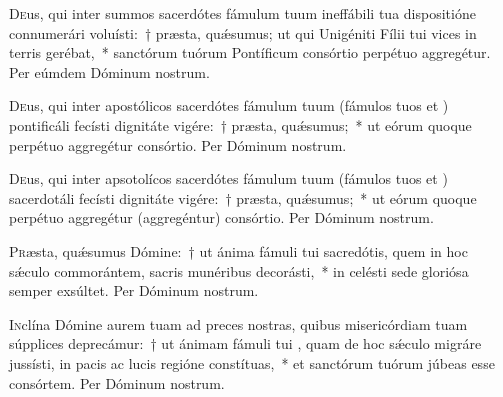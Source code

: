 \documentclass[vesperale_romanum]{subfiles}
\begin{document}

\lettrine{D}{e}us, qui inter summos sacerdótes fámulum tuum \nomen{} ineffábili tua dispositióne connumerári voluísti:~†
 præsta, quǽsumus; ut qui Unigéniti Fílii tui vices in terris gerébat,~*
  sanctórum tuórum Pontíficum consórtio perpétuo aggregétur. Per eúmdem Dóminum nostrum.


\lettrine{D}{e}us,  qui inter apostólicos sacerdótes fámulum tuum \nomen{} (fámulos tuos \nomen{} et  \nomen{}) 
pontificáli fecísti dignitáte vigére:~† præsta, quǽsumus;~* ut eórum quoque perpétuo aggregétur consórtio. Per Dóminum nostrum.






\lettrine{D}{e}us, qui inter apsotolícos sacerdótes fámulum tuum \nomen{} (fámulos tuos \nomen{} et \nomen{})
 sacerdotáli fecísti dignitáte vigére:~† præsta, quǽsumus;~*
  ut eórum quoque perpétuo aggregétur (aggregéntur) consórtio. Per Dóminum nostrum.


\lettrine{P}{r}æsta, quǽsumus Dómine:~† ut ánima fámuli tui \nomen{} sacredótis, quem in hoc sǽculo commorántem,
 sacris munéribus decorásti,~* in celésti sede gloriósa semper exsúltet. 
Per Dóminum nostrum.


\lettrine{I}{n}clína Dómine aurem tuam ad preces nostras, quibus misericórdiam tuam súpplices deprecámur:~† ut ánimam fámuli tui \nomen{}, quam de hoc sǽculo migráre jussísti, in pacis ac lucis regióne constítuas,~* et sanctórum tuórum júbeas esse consórtem. Per Dóminum nostrum.
\end{document}

